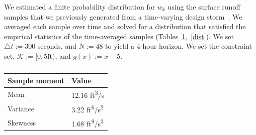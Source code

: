 \documentclass[letterpaper, 10 pt, conference]{ieeeconf}  %
\begin{document}
We estimated a finite probability distribution for $w_k$ using the surface runoff samples that we previously generated from a time-varying design storm~\cite{sustech}. 
We averaged each sample over time and solved for a distribution
that satisfied the empirical statistics of the time-averaged samples (Tables~\ref{stats},~\ref{dist}). 
We set $\triangle t := 300$ seconds, and $N := 48$ to yield a 4-hour horizon.
We set the constraint set, $\mathcal{K} := [0, 5\text{ft})$, and $g(x) := x - 5$.

\begin{table}
\begin{center}
\caption{}
\begin{tabular}{| p{2cm} | p{2cm} |}
\hline
\bf{Sample moment} & \bf{Value}  \\ \hline
Mean & 12.16 ft\textsuperscript{3}/s \\ \hline
Variance & 3.22 ft\textsuperscript{6}/s\textsuperscript{2} \\ \hline
Skewness & 1.68 ft\textsuperscript{9}/s\textsuperscript{3} \\ \hline
\end{tabular}
\begin{flushleft} \end{flushleft}
\label{stats}
\end{center}
\end{table}
\end{document}
